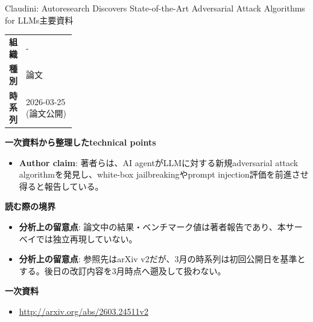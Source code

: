 \begin{technicalnote}{Claudini: Autoresearch Discovers State-of-the-Art Adversarial Attack Algorithms for LLMs}{主要資料}
\begingroup
\begin{tabularx}{\linewidth}{@{}>{\bfseries}p{0.22\linewidth}X@{}}
組織 & - \\
種別 & 論文 \\
時系列 & 2026-03-25 (論文公開) \\
\end{tabularx}
\smallskip
{\bfseries 一次資料から整理したtechnical points}
\begin{itemize}[leftmargin=1.5em,itemsep=0.35em]
\item \textbf{Author claim}: 著者らは、AI agentがLLMに対する新規adversarial attack algorithmを発見し、white-box jailbreakingやprompt injection評価を前進させ得ると報告している。
\end{itemize}
\begin{minipage}{\linewidth}
{\bfseries 読む際の境界}
\begin{itemize}[leftmargin=1.5em,itemsep=0.35em]
\item \textbf{分析上の留意点}: 論文中の結果・ベンチマーク値は著者報告であり、本サーベイでは独立再現していない。
\item \textbf{分析上の留意点}: 参照先はarXiv v2だが、3月の時系列は初回公開日を基準とする。後日の改訂内容を3月時点へ遡及して扱わない。
\end{itemize}
\begin{samepage}
{\bfseries 一次資料}
\begingroup\sloppy
\begin{itemize}[leftmargin=1.5em,itemsep=0.25em]
\item {\scriptsize\url{http://arxiv.org/abs/2603.24511v2}}
\end{itemize}
\endgroup
\end{samepage}
\end{minipage}
\endgroup
\end{technicalnote}
\medskip

